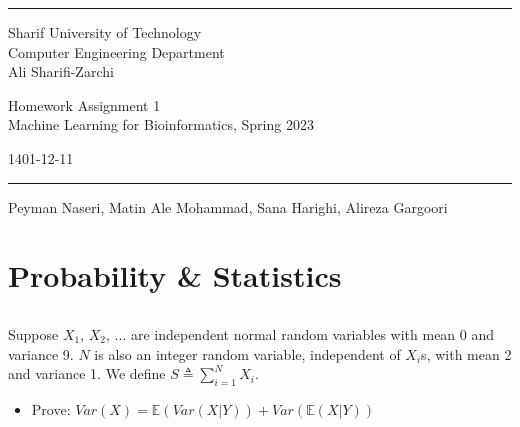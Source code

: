 \documentclass[a4paper]{article}
\begin{document}
	
	
	\fancyhead[C]{}
	\hrule \medskip %
	\begin{minipage}{0.295\textwidth} 
		\raggedright
		\footnotesize
		  Sharif University of Technology \hfill\\   
		Computer Engineering Department\hfill\\
		Ali Sharifi-Zarchi
	\end{minipage}
	\begin{minipage}{0.4\textwidth} 
		\centering 
		\large 
		Homework Assignment 1\\ 
		\normalsize 
		Machine Learning for Bioinformatics, Spring 2023\\ 
	\end{minipage}
	\begin{minipage}{0.295\textwidth} 
		\raggedleft
		\small
            1401-12-11
            \hfill\\
	\end{minipage}
	\medskip\hrule 
	\bigskip
	

        \begin{center}
            Peyman Naseri, Matin Ale Mohammad, Sana Harighi, Alireza Gargoori
        \end{center}
        
        \section{Probability \& Statistics}

        \subsection{}
        Suppose $X_{1}$, $X_{2}$, ... are independent normal random variables with mean 0 and variance 9. $N$ is also an integer random variable, independent of $X_{i}$s, with mean 2 and variance 1. We define
        $S \triangleq  \sum_{i=1}^{N} X_{i}$.
        \begin{itemize}
        \item Prove: $Var(X)=\mathbb{E}(Var(X|Y))+Var(\mathbb{E}(X|Y))$
        \end{itemize}
        
\end{document}

